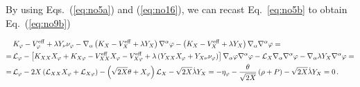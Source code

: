 \documentclass[twocolumn,showpacs, nofootinbib,aps,superscriptaddress, eqsecnum,prd,prl,notitlepage,showkeys,10pt,reprint]{revtex4-1}
\begin{document}
By using Eqs.~(\ref{eq:no5a}) and (\ref{eq:no16}), we can recast Eq.~\eqref{eq:no5b} to obtain Eq.~(\ref{eq:no9b})
%
\begin{widetext}
\begin{align}
\nonumber
&K_\varphi - V^{\rm eff}_\varphi + \lambda Y_\nu \nu_\varphi - \nabla_\alpha \left( K_X - V^{\rm eff}_X + \lambda Y_X \right)\nabla^\alpha \varphi - \left( K_X - V^{\rm eff}_X + \lambda Y_X \right)\nabla_\alpha\nabla^\alpha \varphi =\\
\nonumber
=\,&\mathcal{L}_\varphi- \left[ K_{XX}X_\varphi + K_{X\varphi} - V^{\rm eff}_{XX}X_\varphi - V^{\rm eff}_{X\varphi} + \lambda\left(Y_{XX}X_\varphi+Y_{X\nu}\nu_\varphi\right)\right]\nabla_\alpha\varphi\nabla^\alpha\varphi - \mathcal{L}_X \nabla_\alpha\nabla^\alpha \varphi - \nabla_\alpha\lambda Y_X \nabla^\alpha \varphi =\\
\label{eq:ap4}
=\,&\mathcal{L}_\varphi - 2X \left(\mathcal{L}_{XX} X_\varphi + \mathcal{L}_{X\varphi} \right) - \left(\sqrt{2X}\theta+X_\varphi\right) \mathcal{L}_X - \sqrt{2X}\dot{\lambda} Y_X = -\eta_\varphi - \frac{\theta}{\sqrt{2X}}\left(\rho+P\right) - \sqrt{2X}\dot{\lambda} Y_X =0\,.
\end{align}
\end{widetext}
\end{document}
